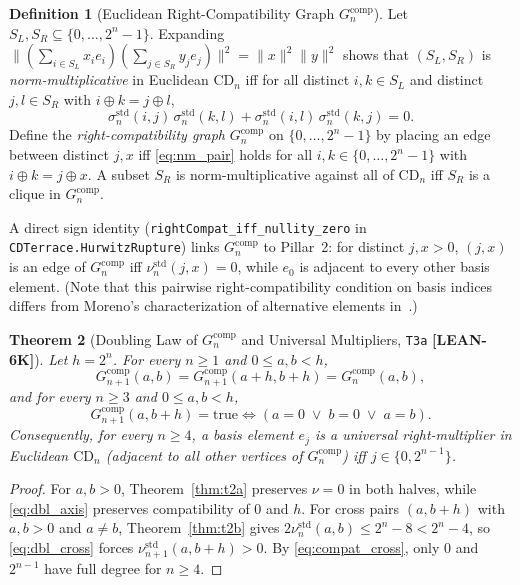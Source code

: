 \documentclass[11pt,reqno]{amsart}
\newcommand{\code}[1]{\textnormal{\texttt{\small\nolinkurl{#1}}}}
\theoremstyle{plain}
\newtheorem{theorem}{Theorem}[section]
\theoremstyle{definition}
\newtheorem{definition}[theorem]{Definition}
\theoremstyle{remark}
\newcommand{\tagLean}{\mbox{\textsf{\textbf{\color{oiBlue}[LEAN-6K]}}}}
\newcommand{\CD}{\mathrm{CD}}
\newcommand{\std}{\mathrm{std}}
\newcommand{\comp}{\mathrm{comp}}
\begin{document}
\begin{definition}[Euclidean Right-Compatibility Graph $G_n^{\comp}$]
\label{def:compat}
Let $S_L, S_R \subseteq \{0, \dots, 2^n - 1\}$. Expanding
$\|(\sum_{i \in S_L} x_i e_i)(\sum_{j \in S_R} y_j e_j)\|^2 = \|x\|^2 \|y\|^2$ shows that
$(S_L, S_R)$ is \emph{norm-multiplicative} in Euclidean $\CD_n$ iff for all distinct
$i, k \in S_L$ and distinct $j, l \in S_R$ with $i \oplus k = j \oplus l$,
\begin{equation}
\label{eq:nm_pair}
  \sigma_n^{\std}(i, j)\,\sigma_n^{\std}(k, l) + \sigma_n^{\std}(i, l)\,\sigma_n^{\std}(k, j) = 0.
\end{equation}
Define the \emph{right-compatibility graph} $G_n^{\comp}$ on $\{0, \dots, 2^n - 1\}$ by placing
an edge between distinct $j, x$ iff \eqref{eq:nm_pair} holds for all $i, k \in \{0, \dots, 2^n - 1\}$
with $i \oplus k = j \oplus x$. A subset $S_R$ is norm-multiplicative against all of $\CD_n$ iff
$S_R$ is a clique in $G_n^{\comp}$.
\end{definition}

A direct sign identity (\code{rightCompat_iff_nullity_zero} in \code{CDTerrace.HurwitzRupture})
links $G_n^{\comp}$ to Pillar~2: for distinct $j, x > 0$, $(j, x)$ is an edge of $G_n^{\comp}$
iff $\nu_n^{\std}(j, x) = 0$, while $e_0$ is adjacent to every other basis element. (Note that
this pairwise right-compatibility condition on basis indices differs from Moreno's
characterization of alternative elements in~\cite{moreno2004}.)

\begin{theorem}[Doubling Law of $G_n^{\comp}$ and Universal Multipliers, \texttt{T3a} \tagLean]
\label{thm:t3a}
Let $h = 2^n$. For every $n \ge 1$ and $0 \le a, b < h$,
\begin{equation}
  G_{n+1}^{\comp}(a, b) = G_{n+1}^{\comp}(a + h, b + h) = G_n^{\comp}(a, b),
\end{equation}
and for every $n \ge 3$ and $0 \le a, b < h$,
\begin{equation}
\label{eq:compat_cross}
  G_{n+1}^{\comp}(a, b + h) = \mathrm{true} \iff (a = 0 \;\lor\; b = 0 \;\lor\; a = b).
\end{equation}
Consequently, for every $n \ge 4$, a basis element $e_j$ is a \emph{universal right-multiplier}
in Euclidean $\CD_n$ (adjacent to all other vertices of $G_n^{\comp}$) iff $j \in \{0, 2^{n-1}\}$.
\end{theorem}

\begin{proof}
For $a, b > 0$, Theorem~\ref{thm:t2a} preserves $\nu = 0$ in both halves, while \eqref{eq:dbl_axis}
preserves compatibility of $0$ and $h$. For cross pairs $(a, b+h)$ with $a, b > 0$ and $a \neq b$,
Theorem~\ref{thm:t2b} gives $2\nu_n^{\std}(a, b) \le 2^n - 8 < 2^n - 4$, so \eqref{eq:dbl_cross}
forces $\nu_{n+1}^{\std}(a, b+h) > 0$. By \eqref{eq:compat_cross}, only $0$ and $2^{n-1}$ have
full degree for $n \ge 4$.
\end{proof}
\end{document}
